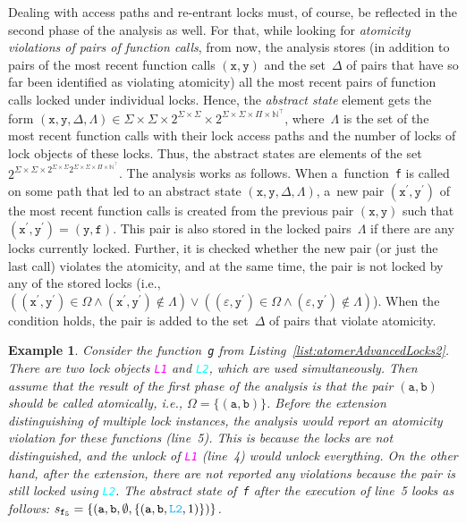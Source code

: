 \documentclass{ExcelAtFIT}
\theoremstyle{example}
\newtheorem{example}{Example}[section]
\begin{document}
Dealing with access paths and re-entrant locks must, of course, be reflected in the second phase of the analysis as well. For that, while looking for \emph{atomicity violations of pairs of function calls}, from now, the analysis stores (in addition to pairs of the most recent function calls $ (\mathtt{x, y}) $ and the set~$ \Delta $ of pairs that have so far been identified as violating atomicity) all the most recent pairs of function calls locked under individual locks. Hence, the \emph{abstract state} element gets the form $ {(\mathtt{x, y}, \Delta, \Lambda)} \in \Sigma \times \Sigma \times 2^{\Sigma \times \Sigma} \times 2^{\Sigma \times \Sigma \times \Pi \times \mathbb{N}^\top} $, where~$ \Lambda $ is the set of the most recent function calls with their lock access paths and the number of locks of lock objects of these locks. Thus, the abstract states are elements of the set $ 2^{\Sigma \times \Sigma \times 2^{\Sigma \times \Sigma} 2^{\Sigma \times \Sigma \times \Pi \times \mathbb{N}^\top}} $. The analysis works as follows. When a~function~\texttt{f} is called on some path that led to an abstract state ${ (\mathtt{x, y}, \Delta, \Lambda) }$, a~new pair ${ (\mathtt{x}^\prime, \mathtt{y}^\prime) }$ of the most recent function calls is created from the previous pair ${ (\mathtt{x, y}) }$ such that $ {(\mathtt{x}^\prime, \mathtt{y}^\prime)} = {(\mathtt{y, f})} $. This pair is also stored in the locked pairs~$ \Lambda $ if there are any locks currently locked. Further, it is checked whether the new pair (or just the last call) violates the atomicity, and at the same time, the pair is not locked by any of the stored locks (i.e., $ ({(\mathtt{x}^\prime, \mathtt{y}^\prime)} \in \Omega \wedge {(\mathtt{x}^\prime, \mathtt{y}^\prime)} \notin \Lambda) \vee ({(\varepsilon, \mathtt{y}^\prime)} \in \Omega \wedge {(\varepsilon, \mathtt{y}^\prime)} \notin \Lambda) $). When the condition holds, the pair is added to the set~$ \Delta $ of pairs that violate atomicity.

\begin{example}
    Consider the function~\texttt{g} from Listing~\ref{list:atomerAdvancedLocks2}. There are two lock objects \textcolor{magenta}{\texttt{L1}} and \textcolor{cyan}{\texttt{L2}}, which are used simultaneously. Then assume that the result of the first phase of the analysis is that the pair ${ (\mathtt{a, b}) }$ should be called atomically, i.e., $ \Omega = {\{(\mathtt{a, b})\}} $. Before the extension distinguishing of multiple lock instances, the analysis would report an atomicity violation for these functions (line~5). This is because the locks are not distinguished, and the unlock of \textcolor{magenta}{\texttt{L1}} (line~4) would unlock everything. On the other hand, after the extension, there are not reported any violations because the pair is still locked using \textcolor{cyan}{\texttt{L2}}. The abstract state of~\texttt{f} after the execution of line~5 looks as follows: $ s_{\mathtt{f}_5} = \{{(\mathtt{a}, \mathtt{b}, \emptyset, \{(\mathtt{a}, \mathtt{b}, \textcolor{cyan}{\mathtt{L2}}, 1)\})}\} $.
\end{example}
\end{document}
